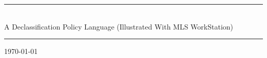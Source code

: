 \documentclass[10pt]{article}
\begin{document}
%
%
%

\onecolumn
\thispagestyle{empty}

\begin{center}
  \noindent\rule{\linewidth}{1mm}\\
  \vspace*{5mm}
  \textsf{\Huge A Declassification Policy Language
                        (Illustrated With MLS WorkStation) \\}
  \vspace*{5mm}
  \rule{\linewidth}{1mm}
\end{center}

\begin{center}
  {\large \today}
\end{center}
\vspace*{10mm}
\end{document}
